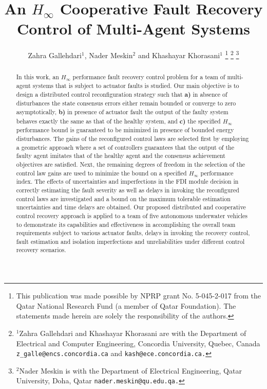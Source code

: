 \documentclass[12pt,draftcls,onecolumn]{IEEEtran}
\author{Zahra Gallehdari$^{1}$, Nader Meskin$^{2}$ and Khashayar Khorasani$^{1}$
\thanks{This publication was made possible by NPRP grant No.  5-045-2-017
from the Qatar National Research Fund (a member of Qatar Foundation).
The statements made herein are solely the responsibility of the authors.}
\thanks{$^{1}$Zahra Gallehdari and Khashayar Khorasani are with the Department
of Electrical and Computer Engineering, Concordia University,
Quebec, Canada
         {\tt\small z\_galle@encs.concordia.ca} and  {\tt\small kash@ece.concordia.ca.}}
\thanks{$^{2}$Nader Meskin is with the Department of Electrical Engineering, Qatar
University, Doha, Qatar
        {\tt\small nader.meskin@qu.edu.qa.}}
}
\date{}
\begin{document}
\title {\LARGE \bf 
An $H_\infty$ Cooperative Fault Recovery Control   of Multi-Agent Systems}
\maketitle

\nocite{Basil:2010:MISC}

\newtheorem {lemmas}{\textbf{Lemma}} 
\newtheorem {theorems}{\textbf{Theorem}} 
\newtheorem {definitions}{\textbf{Definition}} 
\newtheorem {assumptions}{\textbf{Assumption}} 
\newtheorem {corollaries}{\textbf{Corollary}} 
\newtheorem{remarks}{\textbf{Remark}} 
\newtheorem{notations}{\textbf{Notation}} 
\newtheorem{Propositions}{\textbf{Proposition}} 
\newtheorem{facts}{\textbf{Fact}}
\newtheorem{algorithm}{\textbf{Algorithm}}


\begin{abstract}
In this work, an $H_{\infty}$ performance fault recovery control problem for a team of multi-agent systems that is subject to actuator faults is studied. Our main objective is to design a distributed control reconfiguration strategy such that \textbf{a)} in absence of disturbances the  state consensus errors either remain bounded or converge to zero asymptotically, \textbf{b)} in presence of actuator fault the output of the faulty system behaves exactly  the same as that of the healthy system, and \textbf{c)}  the specified  $H_{\infty}$ performance bound is guaranteed to be minimized in presence of bounded energy disturbances. 
The gains of the reconfigured  control laws are selected first by employing a geometric approach  where a set of controllers guarantees that the output of the faulty agent imitates that of the healthy agent and the consensus achievement objectives are satisfied. Next, the remaining degrees of freedom in the selection of the control law gains are used to minimize the bound on a specified $H_{\infty}$ performance index. 
The effects of  uncertainties and imperfections in the FDI module decision in correctly estimating the fault severity as well as delays in invoking the reconfigured control laws are investigated and a bound on the maximum tolerable estimation uncertainties and time delays are obtained.
Our proposed distributed and cooperative control recovery approach is applied to a team of five autonomous underwater vehicles  to demonstrate its capabilities and effectiveness in accomplishing the overall team requirements subject to various actuator faults, delays in invoking the recovery control, fault estimation and isolation imperfections and unreliabilities under different  control recovery scenarios. 
\end{abstract}
\end{document}

